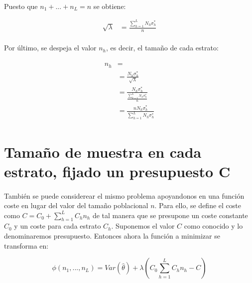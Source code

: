 \documentclass{article}
\begin{document}
      \paragraph{}
      Puesto que $n_1 + ... + n_L = n$ se obtiene:

      \begin{align}
        \sqrt{\lambda} &= \frac{\sum\limits_{h=1}^L N_h \sigma_h^{*}}{n}
      \end{align}

      \paragraph{}
      Por último, se despeja el valor $n_h$, es decir, el tamaño de cada estrato:

      \begin{align}
        \begin{split}
          n_h &= \\
          &= \frac{N_h \sigma_h^{*}}{\sqrt{\lambda}}\\
          &= \frac{N_h \sigma_h^{*}}{\frac{\sum\limits_{h=1}^L N_h \sigma_h^{*} }{n}}\\
          &= \frac{n N_h \sigma_h^{*}}{\sum\limits_{h=1}^L N_h \sigma_h^{*} }
        \end{split}
      \end{align}

    \section{Tamaño de muestra en cada estrato, fijado un presupuesto C}
    \label{sec:dem_2}

      \paragraph{}
      También se puede considerear el mismo problema apoyandonos en una función coste en lugar del valor del tamaño poblacional $n$. Para ello, se define el coste como $C = C_0 + \sum\limits_{h=1}^LC_hn_h$ de tal manera que se presupone un coste constante $C_0$ y un coste para cada estrato $C_h$. Suponemos el valor $C$ como conocido y lo denominaremos presupuesto. Entonces ahora la función a minimizar se transforma en:

      \begin{equation}
        \phi(n_1, ..., n_L) = Var(\widehat{\theta}) + \lambda \left( C_0 \sum\limits_{h=1}^LC_hn_h - C\right)
      \end{equation}
\end{document}

